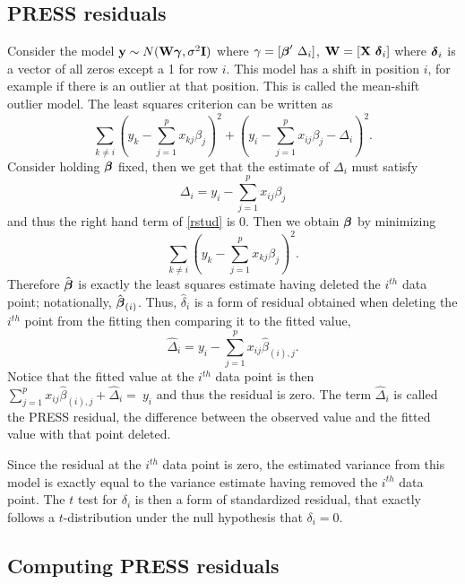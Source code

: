 \subsection{PRESS residuals}
\label{sec:press}

Consider the model $\mathbf{y} \sim N(\mathbf{W} \boldsymbol{\gamma}, \sigma^2 \mathbf{I})$
where $\gamma = [\boldsymbol{\beta}' ~ \Delta_i]$, 
$\mathbf{W} = [\mathbf{X} ~ \boldsymbol{\delta}_i]$ where $\boldsymbol{\delta}_i$ is a vector of all zeros
except a 1 for row $i$. This model has a shift in position $i$, for 
example if there is an outlier at that position. This is called the mean-shift outlier model.
The least squares criterion can be written as
\begin{equation}
\label{rstud}
\sum_{k\neq i} \left(y_k - \sum_{j = 1}^p x_{kj} \beta_j \right)^2
+ \left(y_i - \sum_{j=1}^p x_{ij} \beta_j - \Delta_i\right)^2.
\end{equation}
Consider holding $\boldsymbol{\beta}$ fixed, then we get that the estimate of
$\Delta_i$ must satisfy
$$
\Delta_i = y_i - \sum_{j=1}^p x_{ij} \beta_j
$$
and thus the right hand term of \eqref{rstud} is 0. Then we obtain $\boldsymbol{\beta}$ by minimizing
$$
\sum_{k\neq i} \left(y_k - \sum_{j = 1}^p x_{kj} \beta_j \right)^2.
$$
Therefore $\hat {\boldsymbol{\beta}}$ is exactly the least squares estimate having
deleted the $i^{th}$ data point; notationally, $\hat{\boldsymbol{\beta}}_{(i)}$. Thus, $\hat \delta_i$ 
is a form of residual obtained when deleting
the $i^{th}$ point from the fitting then comparing it to the fitted value, 
$$	
\hat \Delta_i = y_i - \sum_{j=1}^p x_{ij} \hat \beta_{(i),j}.
$$
Notice that the fitted value at the $i^{th}$ data point is then 
$\sum_{j=1}^p x_{ij} \hat \beta_{(i),j} + \hat \Delta_i = \ y_i$ and thus
the residual is zero. The term $\hat \Delta_i$ is called the PRESS residual, the
difference between the observed value and the fitted value with that point deleted.

Since the residual at the $i^{th}$ data point is zero, the estimated variance from
this model is exactly equal to the variance estimate having removed the
$i^{th}$ data point. The $t$ test for $\delta_i$ is then a form of 
standardized residual, that exactly follows a $t$-distribution under the null
hypothesis that $\delta_i = 0$. 

\subsection{Computing PRESS residuals}

